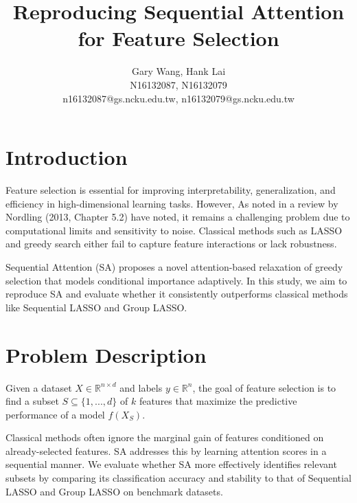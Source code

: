 \documentclass[a4paper,twocolumn]{article} %
\begin{document}

\title{Reproducing Sequential Attention for Feature Selection}
\author{Gary Wang, Hank Lai \\ N16132087, N16132079 \\ n16132087@gs.ncku.edu.tw, n16132079@gs.ncku.edu.tw} 

\maketitle                     %





\section{Introduction}

Feature selection is essential for improving interpretability, generalization, and efficiency in high-dimensional learning tasks.
 However, As noted in a review by Nordling (2013, Chapter 5.2) have noted, it remains a challenging problem due to 
computational limits and sensitivity to noise. Classical methods such as LASSO and greedy search either fail to capture feature interactions or lack robustness.

Sequential Attention (SA) proposes a novel attention-based relaxation of greedy selection that models conditional importance adaptively. 
In this study, we aim to reproduce SA and evaluate whether it consistently outperforms classical methods 
like Sequential LASSO and Group LASSO.


\section{Problem Description}

Given a dataset $X \in \mathbb{R}^{n \times d}$ and labels $y \in \mathbb{R}^n$, the goal of feature selection is to find a subset $S \subseteq \{1, ..., d\}$ of $k$ features that maximize the predictive performance of a model $f(X_S)$.

Classical methods often ignore the marginal gain of features conditioned on already-selected features.
 SA addresses this by learning attention scores in a sequential manner. We evaluate whether SA more effectively 
identifies relevant subsets by comparing its classification accuracy and stability to that of Sequential LASSO and Group LASSO on benchmark datasets.
\end{document}
